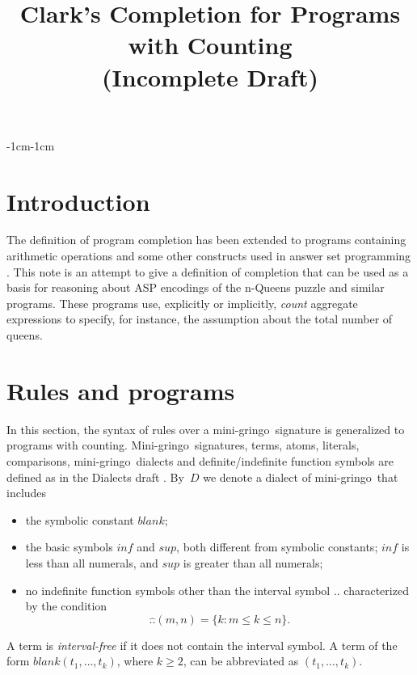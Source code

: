 \documentclass[11pt]{article}
\title{Clark's Completion for Programs with Counting\\
  (Incomplete Draft)}
\def\gringo{{\sc gringo}}
\def\mg{mini-\gringo}
\begin{document}
\maketitle

\begin{adjustwidth}{-1cm}{-1cm}

  \section{Introduction}
  
  The definition of program completion \cite{cla78} has been extended
  to programs containing arithmetic operations and some other constructs
  used in answer set programming \cite{har17a,lif23,fan24b,fan22}.
  This note is an attempt to give a definition of completion
  that can be used   as a basis for reasoning about ASP encodings
  of the n-Queens puzzle \cite[Section~3.1]{geb11b} and similar programs.
  These programs use, explicitly or implicitly, \emph{count} aggregate
  expressions to specify, for instance, the assumption about the total
  number of queens.
  
  \section{Rules and programs}\label{sec:rules}
  
  In this section,
  the syntax of rules over a \mg\ signature %
  is   generalized to programs with counting.
    Mini-\gringo\ signatures, terms, atoms,
  literals, comparisons, \mg\ dialects and definite/indefinite function
  symbols are defined
  as in the Dialects draft \cite[Sections~2 and~3]{fan26b}.  By~$D$ we
  denote a dialect of \mg\ that includes
  \begin{itemize}
\item the symbolic constant $\mathit{blank}$;
  \item the basic symbols $\mathit{inf}$ and $\mathit{sup}$, both
    different from symbolic constants; $\mathit{inf}$ is less than all
    numerals, and $\mathit{sup}$ is greater  than all numerals;
    \item no indefinite function symbols
  other than the interval symbol $..$ characterized by the condition
  $$\widehat{..}(m,n)=\{k: m\leq k\leq n\}.$$
\end{itemize}
A term is \emph{interval-free} if it does not
contain the interval symbol.
A term of the form $\mathit{blank}(t_1,\dots,t_k)$, where $k\geq 2$,
can be abbreviated as $(t_1,\dots,t_k)$.


\end{adjustwidth}
\end{document}
